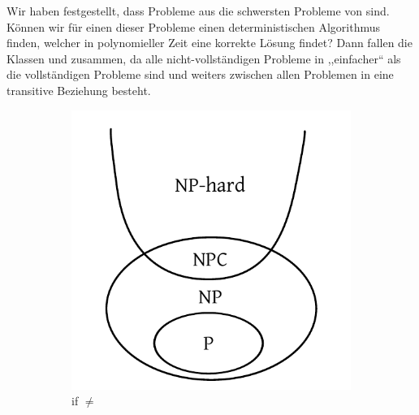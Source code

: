 Wir haben festgestellt, dass Probleme aus \cNPC{} die schwersten Probleme von \cNP{} sind. Können wir für einen dieser Probleme einen deterministischen Algorithmus finden, welcher in polynomieller Zeit eine korrekte Lösung findet? Dann fallen die Klassen \cP{} und \cNP{} zusammen, da alle nicht-vollständigen Probleme in \cNP{} ,,einfacher`` als die vollständigen Probleme sind und weiters zwischen allen Problemen in \cNPC{} eine transitive Beziehung besteht.
%
\begin{figure}
  \begin{center}
    \begin{subfigure}[b]{0.4\textwidth}
      \includegraphics[width=\textwidth]{img/np_neq_p.pdf}
      \caption{if \cP{} $\neq$ \cNP{}}
    \end{subfigure}
    \begin{subfigure}[b]{0.4\textwidth}

\end{subfigure}
\end{center}
\end{figure}
